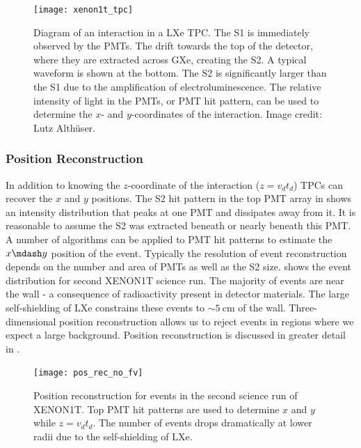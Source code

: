 \begin{figure}
\centering
\texttt{[image: xenon1t\_tpc]}
\caption{Diagram of an interaction in a LXe TPC.  The S1 is immediately
observed by the PMTs.  The \electron drift towards the top of the detector, where they are extracted across GXe,
creating the S2.  A typical waveform is shown at the bottom.  The S2 is significantly
larger than the S1 due to the amplification of electroluminescence.  The relative intensity of light in the PMTs, or PMT hit
pattern, can be used to determine the $x$- and $y$-coordinates of the interaction.  Image credit: Lutz Alth\"{u}ser.}
\label{fig:tpcs_signal_tpc}
\end{figure}



\subsubsection{Position Reconstruction}
\label{subsubsec:tpcs_signals_posrec}
In addition to knowing the $z$-coordinate of the interaction ($z = v_{d} t_{d}$) TPCs can recover the $x$ and $y$ positions.  The S2
hit pattern in the top PMT array in  shows an intensity distribution that peaks at one
PMT and dissipates away from it.  It is reasonable to assume the S2 was extracted beneath or nearly beneath this PMT.  A number of
algorithms can be applied to PMT hit patterns to estimate the $x \mdash y$ position of the event.  Typically the resolution of event
reconstruction depends on the number and area of PMTs as well as the S2 size.   shows the event
distribution for second XENON1T science run.  The majority of events are near the wall - a consequence of
radioactivity present in detector materials.  The large self-shielding of LXe constrains these events to ${\sim}5\ \mathrm{cm}$ of the
wall.  Three-dimensional position reconstruction allows us to reject events in regions where we
expect a large background.  Position reconstruction is discussed in greater detail in
.

\begin{figure}
\centering
\texttt{[image: pos\_rec\_no\_fv]}
\caption{Position reconstruction for events in the second science run of XENON1T.  Top PMT hit patterns are used to determine $x$ and $y$
while $z = v_{d} t_{d}$.  The number of events drops dramatically at lower radii due to the self-shielding of LXe.}
\label{fig:tpcs_signal_tpc}
\end{figure}




